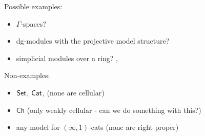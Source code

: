 \documentclass[a4paper,10pt
,draft
]{article}%
\renewcommand{\1}{\eta}%
\begin{document}
\begin{example}
      Possible examples:
      \begin{itemize}
      \item $\Gamma$-spaces?
      \item dg-modules with the projective model structure?
      \item simplicial modules over a ring? \cite[\S 3.1.15]{Rez96}, \cite[Example 4.23]{Cav}
      \end{itemize}
\end{example}





\begin{example}
      Non-examples:
      \begin{itemize}
      \item $\mathsf{Set}$, $\mathsf{Cat}$, (none are cellular)
      \item $\mathsf{Ch}$ (only weakly cellular - can we do something with this?)
      \item any model for $(\infty,1)$-cats (none are right proper)
      \end{itemize}
\end{example}
\end{document}
